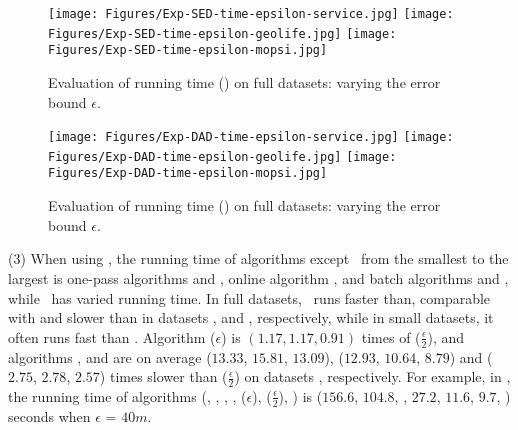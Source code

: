{\begin{figure*}[tb!]
	\centering
	\texttt{[image: Figures/Exp-SED-time-epsilon-service.jpg]}	\hspace{0.5ex}
	\texttt{[image: Figures/Exp-SED-time-epsilon-geolife.jpg]}	\hspace{0.5ex}
	\texttt{[image: Figures/Exp-SED-time-epsilon-mopsi.jpg]}	
	\vspace{-2ex}
	\caption{\small Evaluation of running time (\sed) on full datasets: varying the error bound $\epsilon$.}\label{fig:time-epsilon-sed}
	\vspace{-2ex}
\end{figure*}

\begin{figure*}[tb!]
	\centering
	\texttt{[image: Figures/Exp-DAD-time-epsilon-service.jpg]} 	\hspace{0.5ex}
	\texttt{[image: Figures/Exp-DAD-time-epsilon-geolife.jpg]}	\hspace{0.5ex}
	\texttt{[image: Figures/Exp-DAD-time-epsilon-mopsi.jpg]}		
	\vspace{-2ex}
	\caption{\small Evaluation of running time (\dad) on full datasets: varying the error bound $\epsilon$.}\label{fig:time-epsilon-dad}
	\vspace{-2ex}
\end{figure*}



\sstab (3) When using \sed, the running time of algorithms except \dagots~from the smallest to the largest is one-pass algorithms \cised and , online algorithm \squishe, and batch algorithms \tpa and \dpa, while \dagots~has varied running time. In full datasets, \dagots~runs faster than, comparable with and slower than \dpa in datasets \ucar, \geolife and \mopsi, respectively, while in small datasets, it often runs fast than \dpa.
Algorithm \cised(${\epsilon}$) is $(1.17, 1.17, 0.91)$ times of \cised($\frac{\epsilon}{2}$), and algorithms \tpa, \dpa and \squishe are on average
 ($13.33$, $15.81$, $13.09$), ($12.93$, $10.64$, $8.79$) and
($2.75$, $2.78$, $2.57$) times slower than \cised($\frac{\epsilon}{2}$) on datasets \dSets, respectively.
%
For example, in \mopsi, the running time of algorithms
(\tpa, \dpa, {\dagots}, \squishe, \cised($\epsilon$), \cised($\frac{\epsilon}{2}$), ) is ($156.6$, $104.8$, , $27.2$, $11.6$, $9.7$, ) seconds when $\epsilon$ = $40m$.

}
